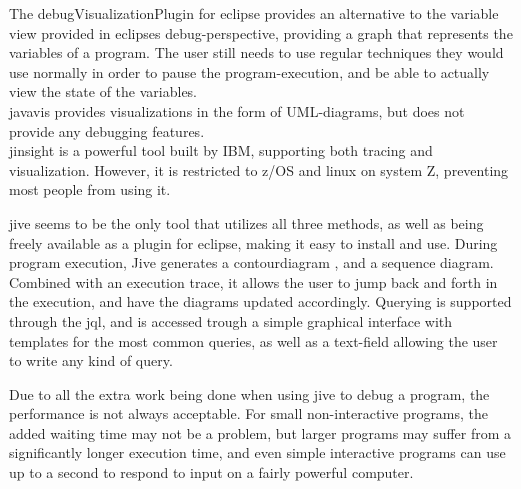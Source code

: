 The \gls{debugVisualizationPlugin} for eclipse provides an alternative to the variable view provided in eclipses debug-perspective, providing a graph that represents the variables of a program.
The user still needs to use regular techniques they would use normally in order to pause the program-execution, and be able to actually view the state of the variables.
~\\

\Gls{javavis} \cite{Oechsle2002} provides visualizations in the form of UML-diagrams, but does not provide any debugging features.
~\\

\Gls{jinsight} \cite{Pauw} is a powerful tool built by IBM, supporting both tracing and visualization.
However, it is restricted to z/OS and linux on system Z, preventing most people from using it.
~\\

\begin{sloppypar}
\Gls{jive} seems to be the only tool that utilizes all three methods, as well as being freely available as a plugin for eclipse, making it easy to install and use.
During program execution, Jive generates a \gls{contourdiagram} \cite{Jayaraman1996}, and a sequence diagram.
Combined with an execution trace, it allows the user to jump back and forth in the execution, and have the diagrams updated accordingly.
Querying is supported through the \gls{jql}, and is accessed trough a simple graphical interface with templates for the most common queries, as well as a text-field allowing the user to write any kind of query.
~\\
\end{sloppypar}

Due to all the extra work being done when using jive to debug a program, the performance is not always acceptable.
For small non-interactive programs, the added waiting time may not be a problem, but larger programs may suffer from a significantly longer execution time, and even simple interactive programs can use up to a second to respond to input on a fairly powerful computer.
~\\






